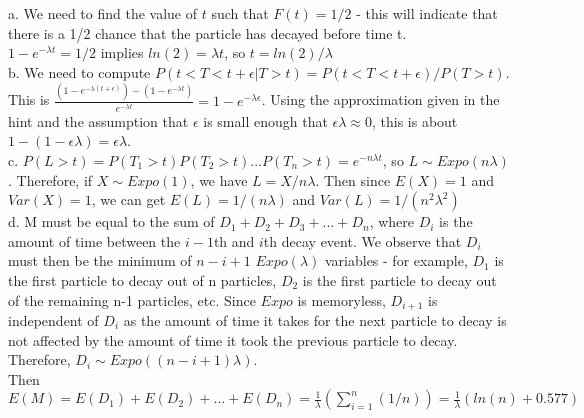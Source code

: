 a. We need to find the value of \(t\) such that \(F(t) = 1/2\) - this will indicate that there is a 1/2 chance that the particle has decayed before time t.\\

\(1-e^{-\lambda t} = 1/2\) implies \(ln(2) = \lambda t\), so \(t = ln(2)/\lambda\)\\

b. We need to compute \(P(t < T < t+\epsilon | T > t) = P(t < T < t+\epsilon)/ P(T > t)\). This is \(\frac{(1-e^{-\lambda(t+\epsilon)})-(1-e^{-\lambda t})}{e^{-\lambda t}} = 1 - e^{-\lambda\epsilon}\). Using the approximation given in the hint and the assumption that \(\epsilon\) is small enough that \(\epsilon\lambda \approx 0\), this is about \(1-(1-\epsilon\lambda) = \epsilon\lambda\).\\

c. \(P(L > t) = P(T_{1}>t)P(T_{2}>t)...P(T_{n}>t) = e^{-n\lambda t}\), so \(L \sim Expo(n\lambda)\). Therefore, if \(X \sim Expo(1)\), we have \(L = X/n\lambda\). Then since \(E(X) = 1\) and \(Var(X)=1\), we can get \(E(L) = 1/(n\lambda)\) and \(Var(L) = 1/(n^{2}\lambda^{2})\)\\

d. M must be equal to the sum of \(D_{1} + D_{2} + D_{3} +...+D_{n}\), where \(D_{i}\) is the amount of time between the \(i-1\)th and \(i\)th decay event. We observe that \(D_{i}\) must then be the minimum of \(n-i+1\) \(Expo(\lambda)\) variables - for example, \(D_{1}\) is the first particle to decay out of n particles, \(D_{2}\) is the first particle to decay out of the remaining n-1 particles, etc. Since \(Expo\) is memoryless, \(D_{i+1}\) is independent of \(D_{i}\) as the amount of time it takes for the next particle to decay is not affected by the amount of time it took the previous particle to decay. Therefore, \(D_{i} \sim Expo((n-i+1)\lambda)\).\\

Then \(E(M) = E(D_{1}) + E(D_{2}) +... +E(D_{n}) = \frac{1}{\lambda}(\sum_{i=1}^{n}(1/n)) = \frac{1}{\lambda}(ln(n) + 0.577) \)
